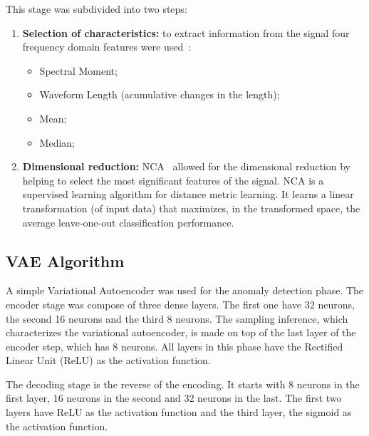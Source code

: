 \documentclass[nouppercase]{ifmbe}
\begin{document}
This stage was subdivided into two steps:

\begin{enumerate}

    \item \textbf{Selection of characteristics:} to extract information from the signal four frequency domain features were used~\cite{Jose2018}:
    \begin{itemize}
    	\item  Spectral Moment;
    	\item  Waveform Length (acumulative changes in the length);
    	\item  Mean;
    	\item  Median;
    \end{itemize}
    \item \textbf{Dimensional reduction:} NCA~\cite{Phinyomark2013} allowed for the dimensional reduction by helping to select the most significant features of the signal. NCA is a supervised learning algorithm for distance metric learning. It learns a linear transformation (of input data) that maximizes, in the transformed space, the average leave-one-out classification performance.
\end{enumerate}

\subsection{VAE Algorithm}
A simple Variational Autoencoder was used for the anomaly detection phase. The encoder stage was compose of three dense layers. The first one have 32 neurons, the second 16 neurons and the third 8 neurons. The sampling inference, which characterizes the variational autoencoder, is made on top of the last layer of the encoder step, which has 8 neurons. All layers in this phase have the Rectified Linear Unit (ReLU) as the activation function.

The decoding stage is the reverse of the encoding. It starts with 8 neurons in the first layer, 16 neurons in the second and 32 neurons in the last. The first two layers have ReLU as the activation function and the third layer, the sigmoid as the activation function.
\end{document}
